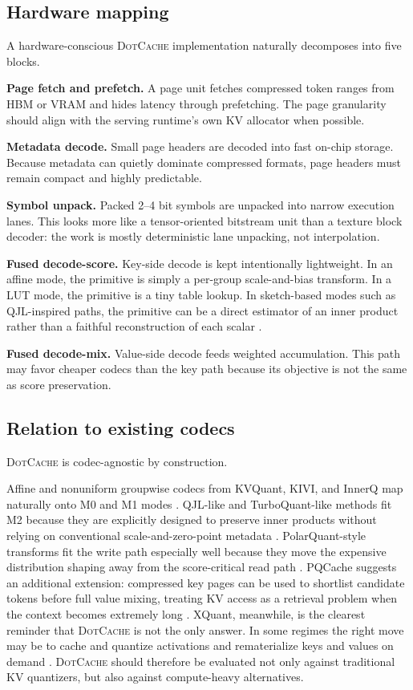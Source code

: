 \documentclass[11pt]{article}
\newcommand{\method}{\textsc{DotCache}}
\newcommand{\kv}{KV}
\begin{document}
\subsection{Hardware mapping}

A hardware-conscious \method{} implementation naturally decomposes into five blocks.

\textbf{Page fetch and prefetch.} A page unit fetches compressed token ranges from HBM or VRAM and hides latency through prefetching. The page granularity should align with the serving runtime's own \kv{} allocator when possible.

\textbf{Metadata decode.} Small page headers are decoded into fast on-chip storage. Because metadata can quietly dominate compressed formats, page headers must remain compact and highly predictable.

\textbf{Symbol unpack.} Packed 2--4 bit symbols are unpacked into narrow execution lanes. This looks more like a tensor-oriented bitstream unit than a texture block decoder: the work is mostly deterministic lane unpacking, not interpolation.

\textbf{Fused decode-score.} Key-side decode is kept intentionally lightweight. In an affine mode, the primitive is simply a per-group scale-and-bias transform. In a LUT mode, the primitive is a tiny table lookup. In sketch-based modes such as QJL-inspired paths, the primitive can be a direct estimator of an inner product rather than a faithful reconstruction of each scalar \cite{qjl}.

\textbf{Fused decode-mix.} Value-side decode feeds weighted accumulation. This path may favor cheaper codecs than the key path because its objective is not the same as score preservation.

\subsection{Relation to existing codecs}

\method{} is codec-agnostic by construction.

Affine and nonuniform groupwise codecs from KVQuant, KIVI, and InnerQ map naturally onto M0 and M1 modes \cite{kvquant,kivi,innerq}. QJL-like and TurboQuant-like methods fit M2 because they are explicitly designed to preserve inner products without relying on conventional scale-and-zero-point metadata \cite{qjl,turboquant}. PolarQuant-style transforms fit the write path especially well because they move the expensive distribution shaping away from the score-critical read path \cite{polarquant}. PQCache suggests an additional extension: compressed key pages can be used to shortlist candidate tokens before full value mixing, treating \kv{} access as a retrieval problem when the context becomes extremely long \cite{pqcache}. XQuant, meanwhile, is the clearest reminder that \method{} is not the only answer. In some regimes the right move may be to cache and quantize activations and rematerialize keys and values on demand \cite{xquant}. \method{} should therefore be evaluated not only against traditional \kv{} quantizers, but also against compute-heavy alternatives.
\end{document}
